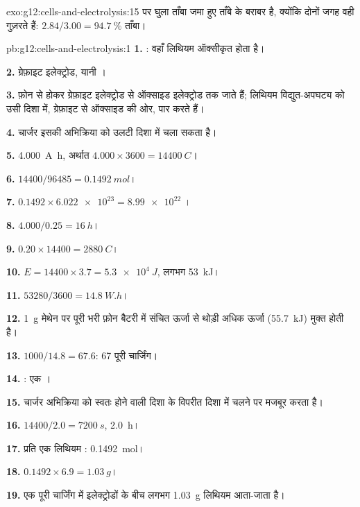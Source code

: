\begin{solution}{exo:g12:cells-and-electrolysis:15}
 पर घुला ताँबा जमा हुए ताँबे के बराबर है, क्योंकि दोनों जगह वही
 गुज़रते हैं: $2.84/3.00 = \qty{94.7}{\percent}$ ताँबा।
\end{solution}

\begin{solution}{pb:g12:cells-and-electrolysis:1}
\textbf{1.} : वहाँ लिथियम ऑक्सीकृत होता है।

\textbf{2.} ग्रेफ़ाइट इलेक्ट्रोड, यानी ।

\textbf{3.}  फ़ोन से होकर ग्रेफ़ाइट इलेक्ट्रोड से
ऑक्साइड इलेक्ट्रोड तक जाते हैं; लिथियम  विद्युत-अपघट्य को उसी
दिशा में, ग्रेफ़ाइट से ऑक्साइड की ओर, पार करते हैं।

\textbf{4.} चार्जर इसकी अभिक्रिया को उलटी दिशा में चला सकता है।

\textbf{5.} \qty{4.000}{A.h}, अर्थात $4.000 \times 3600 =
\qty{14400}{C}$।

\textbf{6.} $14400/96485 = \qty{0.1492}{mol}$।

\textbf{7.} $0.1492 \times \num{6.022e23} = \num{8.99e22}$ ।

\textbf{8.} $4.000/0.25 = \qty{16}{h}$।

\textbf{9.} $0.20 \times 14400 = \qty{2880}{C}$।

\textbf{10.} $E = 14400 \times 3.7 = \qty{5.3e4}{J}$, लगभग \qty{53}{kJ}।

\textbf{11.} $53280/3600 = \qty{14.8}{W.h}$।

\textbf{12.} \qty{1}{g} मेथेन  पर पूरी भरी फ़ोन बैटरी में संचित ऊर्जा से
थोड़ी अधिक ऊर्जा (\qty{55.7}{kJ}) मुक्त होती है।

\textbf{13.} $1000/14.8 = 67.6$: 67 पूरी चार्जिंग।

\textbf{14.} : एक ।

\textbf{15.} चार्जर अभिक्रिया को स्वतः होने वाली दिशा के विपरीत दिशा में
चलने पर मजबूर करता है।

\textbf{16.} $14400/2.0 = \qty{7200}{s}$, \qty{2.0}{h}।

\textbf{17.} प्रति  एक लिथियम : \qty{0.1492}{mol}।

\textbf{18.} $0.1492 \times 6.9 = \qty{1.03}{g}$।

\textbf{19.} एक पूरी चार्जिंग में इलेक्ट्रोडों के बीच लगभग \qty{1.03}{g} लिथियम
आता-जाता है।
\end{solution}
